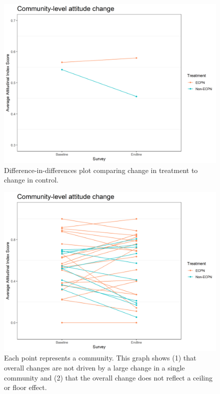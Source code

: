 \documentclass[
]{article}
\begin{document}
\begin{figure}[H]
\centering
\includegraphics[width=\linewidth]{../data_and_code/survey_dat/figs/did_plots/attitudeComm_plot.png}
\caption{Difference-in-differences plot comparing change in treatment to change in control.}\label{fig:att_comm}
\end{figure}

\begin{figure}[H]
\centering
\includegraphics[width=\linewidth]{../data_and_code/survey_dat/figs/did_plots/attitudeComm.plot_disag.png}
\caption{Each point represents a community. This graph shows (1) that overall changes are not driven by a large change in a single community and (2) that the overall change does not reflect a ceiling or floor effect.}\label{fig:att_comm_dis}
\end{figure}
\end{document}
